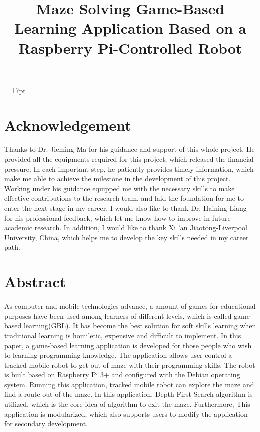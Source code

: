 \documentclass[11pt,times,oneside,openright,hardcopy]{eeereport}
\title{Maze Solving Game-Based Learning Application Based on a Raspberry Pi-Controlled Robot}
\subtitle{}
\begin{document}
\lstset{language=Pascal}
\baselineskip = 17pt
\begin{titlepage}

\newpage
\thispagestyle{empty}
\end{titlepage}

\frontmatter

\tableofcontents
\chapter{Acknowledgement}
Thanks to Dr. Jieming Ma for his guidance and support of this whole project. He provided all the equipments required for this project, which released the financial pressure. 
In each important step, he patiently provides timely information, which make me able to achieve the milestone in the development of this project. 
Working under his guidance equipped me with the necessary skills to make effective contributions to the research team, 
and laid the foundation for me to enter the next stage in my career. I would also like to thank Dr. Haining Liang for his professional feedback, which let me know how to improve in future academic research. 
In addition, I would like to thank Xi 'an Jiaotong-Liverpool University, China, which helps me to develop the key skills needed in my career path.
\chapter{Abstract}
As computer and mobile technologies advance, a amount of games for educational purposes have been used among learners of different levels, which is called game-based learning(GBL).
It has become the best solution for soft skills learning when traditional learning is homiletic, expensive and difficult to implement.
In this paper, a game-based learning application is developed for those people who wish to learning programming knowledge. 
The application allows user control a tracked mobile robot to get out of maze with their programming skills. 
The robot is built based on Raspberry Pi 3+ and configured with the Debian operating system.
Running this application, tracked mobile robot can explore the maze and find a route out of the maze. In this application, Depth-First-Search algorithm is utilized, which is the core idea of algorithm to exit the maze.
Furthermore, This application is modularized, which also supports users to modify the application for secondary development.
\end{document}
